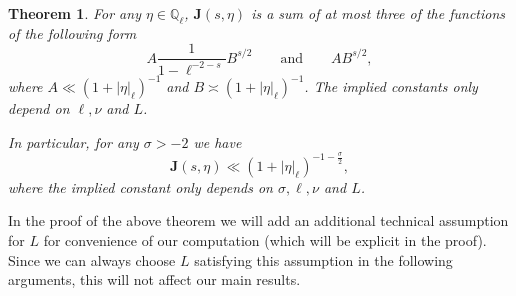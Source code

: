 \documentclass[10pt,oneside,reqno]{amsart}
\newcommand\bJ{\mathbf{J}}
\newcommand\QQ{\mathbb{Q}}
\theoremstyle{THEOREM}
\newtheorem{theorem}{Theorem}[section]
\theoremstyle{DEFINITION}
\theoremstyle{EXERCISE}
\numberwithin{equation}{section}
\begin{document}
\begin{theorem}\label{thm:ladicsingular}
For any $\eta\in \QQ_\ell$, $\bJ(s,\eta)$ is a sum of at most three of the functions of the following form
\[
A\frac{1}{1-\ell^{-2-s}}B^{s/2}\qquad\text{and}\qquad AB^{s/2},
\]
where $A\ll (1+|\eta|_\ell)^{-1}$ and $B\asymp (1+|\eta|_\ell)^{-1}$. The implied constants only depend on $\ell,\nu$ and $L$. 

In particular, for any $\sigma>-2$ we have
\[
\bJ(s,\eta)\ll (1+|\eta|_\ell)^{-1-\frac{\sigma}{2}},
\]
where the implied constant only depends on $\sigma,\ell,\nu$ and $L$. 
\end{theorem}
In the proof of the above theorem we will add an additional technical assumption for $L$ for convenience of our computation (which will be explicit in the proof). Since we can always choose $L$ satisfying this assumption in the following arguments, this will not affect our main results.
\end{document}
